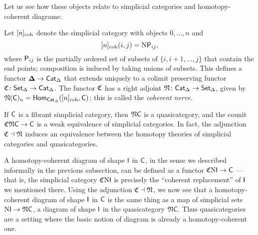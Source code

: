 \documentclass[a4paper,11pt]{article}
\begin{document}
Let us see how these objects relate to simplicial categories and
homotopy-coherent diagrams:
\begin{defn}
  Let $[n]_{\text{\textup{coh}}}$ denote the simplicial category with objects
  $0,\ldots,n$ and 
  \[ [n]_{\text{\textup{coh}}}(i,j) = \mathrm{N} \textup{\textsf{P}}_{ij},\] where $\textup{\textsf{P}}_{ij}$ is the
  partially ordered set of subsets of $\{i,i+1,\dots,j\}$ that contain
  the end points; composition is induced by taking unions of
  subsets. This defines a functor $\simp \to \sCat$ that extends
  uniquely to a colimit preserving functor
  $\Ccoh \colon \sSet \to \sCat$. The functor $\mathfrak{C}$ has a right
  adjoint $\Ncoh \colon \sCat \to \sSet$, given by
  $\mathfrak{N}(\textup{\textsf{C}})_{n} = \textup{\textsf{Hom}}_{\textup{\textsf{Cat}}_{\Delta}}([n]_{\text{\textup{coh}}}, \textup{\textsf{C}})$; this is
  called the \emph{coherent nerve}.
\end{defn}
If $\textup{\textsf{C}}$ is a fibrant simplicial category, then $\mathfrak{N}\textup{\textsf{C}}$ is a
quasicategory, and the counit $\Ccoh\Ncoh\uC \to \uC$ is a weak
equivalence of simplicial categories. In fact, the adjunction
$\mathfrak{C} \dashv \mathfrak{N}$ induces an equivalence between the homotopy
theories of simplicial categories and quasicategories.

\begin{remark}\label{rmk:Ccoh}
  A homotopy-coherent diagram of shape $\textup{\textsf{I}}$ in $\textup{\textsf{C}}$, in the sense we
  described informally in the previous subsection, can be defined as a
  functor $\Ccoh \Nrv \uI \to \uC$ --- that is, the simplicial
  category $\mathfrak{C} \mathrm{N} \textup{\textsf{I}}$ is precisely the ``coherent replacement''
  of $\textup{\textsf{I}}$ we mentioned there. Using the adjunction
  $\mathfrak{C} \dashv \mathfrak{N}$, we now see that a homotopy-coherent diagram
  of shape $\textup{\textsf{I}}$ in $\textup{\textsf{C}}$ is the same thing as a map of simplicial
  sets $\Nrv \uI \to \Ncoh \uC$, \ie{} a diagram of shape $\textup{\textsf{I}}$ in the
  quasicategory $\mathfrak{N} \textup{\textsf{C}}$.  Thus quasicategories are a setting where
  the basic notion of diagram is already a homotopy-coherent one.
\end{remark}
\end{document}
